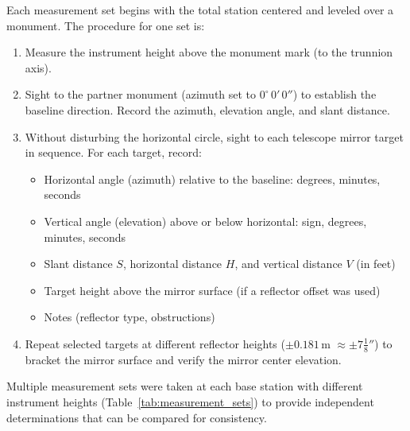 \documentclass[11pt,letterpaper]{article}
\newcommand{\degree}{^\circ}
\begin{document}
Each measurement set begins with the total station centered and leveled over a monument. The procedure for one set is:

\begin{enumerate}[nosep]
    \item Measure the instrument height above the monument mark (to the trunnion axis).
    \item Sight to the partner monument (azimuth set to $0\degree\,0'\,0''$) to establish the baseline direction. Record the azimuth, elevation angle, and slant distance.
    \item Without disturbing the horizontal circle, sight to each telescope mirror target in sequence. For each target, record:
    \begin{itemize}[nosep]
        \item Horizontal angle (azimuth) relative to the baseline: degrees, minutes, seconds
        \item Vertical angle (elevation) above or below horizontal: sign, degrees, minutes, seconds
        \item Slant distance $S$, horizontal distance $H$, and vertical distance $V$ (in feet)
        \item Target height above the mirror surface (if a reflector offset was used)
        \item Notes (reflector type, obstructions)
    \end{itemize}
    \item Repeat selected targets at different reflector heights ($\pm 0.181$\,m $\approx \pm 7\frac{1}{8}''$) to bracket the mirror surface and verify the mirror center elevation.
\end{enumerate}

Multiple measurement sets were taken at each base station with different instrument heights (Table~\ref{tab:measurement_sets}) to provide independent determinations that can be compared for consistency.
\end{document}
